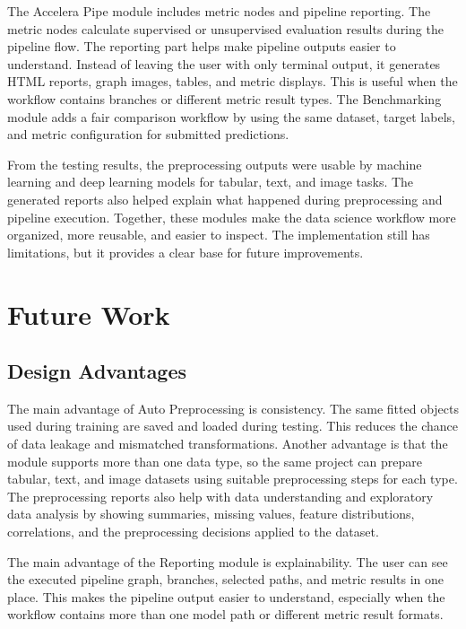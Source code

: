 \documentclass[12pt,a4paper,oneside]{report}
\begin{document}
\noindent The Accelera Pipe module includes metric nodes and pipeline
reporting. The metric nodes calculate supervised or unsupervised evaluation
results during the pipeline flow. The reporting part helps make pipeline
outputs easier to understand. Instead of leaving the user with only terminal
output, it generates HTML reports, graph images, tables, and metric displays.
This is useful when the workflow contains branches or different metric result
types. The
Benchmarking module adds a fair comparison workflow by using the same dataset,
target labels, and metric configuration for submitted predictions.

\noindent From the testing results, the preprocessing outputs were usable by
machine learning and deep learning models for tabular, text, and image tasks.
The generated reports also helped explain what happened during preprocessing
and pipeline execution. Together, these modules make the data science workflow
more organized, more reusable, and easier to inspect. The implementation still
has limitations, but it provides a clear base for future improvements.


\section{Future Work}



\subsection{Design Advantages}

The main advantage of Auto Preprocessing is consistency. The same fitted
objects used during training are saved and loaded during testing. This reduces
the chance of data leakage and mismatched transformations. Another advantage is
that the module supports more than one data type, so the same project can
prepare tabular, text, and image datasets using suitable preprocessing steps for
each type. The preprocessing reports also help with data understanding and
exploratory data analysis by showing summaries, missing values, feature
distributions, correlations, and the preprocessing decisions applied to the
dataset.

\noindent The main advantage of the Reporting module is explainability. The user can see
the executed pipeline graph, branches, selected paths, and metric results in one
place. This makes the pipeline output easier to understand, especially when the
workflow contains more than one model path or different metric result formats.
\end{document}
